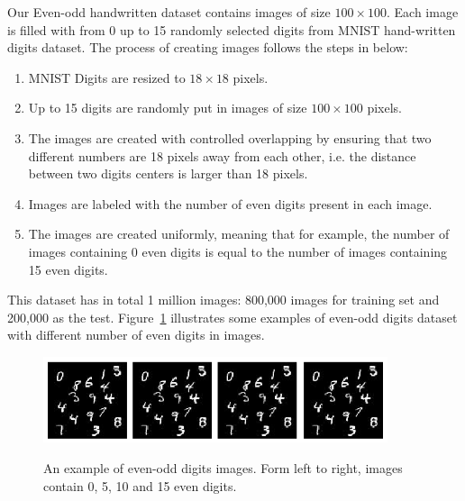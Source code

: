 Our Even-odd handwritten dataset contains images of size $100\times100$. Each image is filled with from 0 up to 15 randomly selected digits from MNIST hand-written digits dataset. The process of creating images follows the steps in below:
\begin{enumerate}
\item MNIST Digits are resized to $18\times18$ pixels.
\item Up to 15 digits are randomly put in images of size $100\times100$ pixels.
\item The images are created with controlled overlapping by ensuring that two different numbers are 18 pixels away from each other, i.e. the distance between two digits centers is larger than 18 pixels.
\item Images are labeled with the number of even digits present in each image. 
\item The images are created uniformly, meaning that for example, the number of images containing 0 even digits is equal to the number of images containing 15 even digits.
\end{enumerate}
 This dataset has in total 1 million images: 800,000 images for training set and 200,000 as the test. Figure~\ref{fig:l2cmnist} illustrates some examples of even-odd digits dataset with different number of even digits in images.

\begin{figure}[H]
	\centering
	{\includegraphics[width=0.9\textwidth]{images/l2cmnist}}
		\caption{An example of even-odd digits images. Form left to right, images contain 0, 5, 10 and 15 even digits.}
	\label{fig:l2cmnist}
\end{figure}


